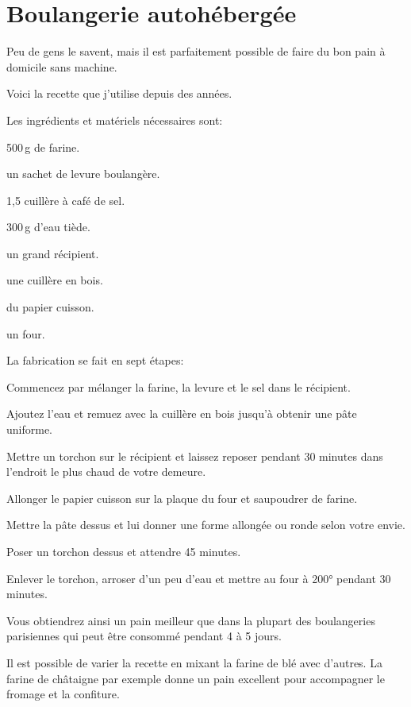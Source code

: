 \section{Boulangerie autohébergée}

Peu de gens le savent, mais il est parfaitement possible de faire du bon pain
à domicile sans machine.

Voici la recette que j'utilise depuis des années.

Les ingrédients et matériels nécessaires sont:

\begin{ingredients}
	\item 500\,g de farine.
	\item un sachet de levure boulangère.
	\item 1,5 cuillère à café de sel.
	\item 300\,g d'eau tiède.
	\item un grand récipient.
	\item une cuillère en bois.
	\item du papier cuisson.
	\item un four.
\end{ingredients}

La fabrication se fait en sept étapes:
\begin{instructions}

	\item Commencez par mélanger la farine, la levure et le sel dans le
	récipient.

	\item Ajoutez l'eau et remuez avec la cuillère en bois jusqu'à obtenir une
	pâte uniforme.

	\item Mettre un torchon sur le récipient et laissez reposer pendant 30
	minutes dans l'endroit le plus chaud de votre demeure.

	\item Allonger le papier cuisson sur la plaque du four et saupoudrer de
	farine.

	\item Mettre la pâte dessus et lui donner une forme allongée ou ronde
	selon votre envie.

	\item Poser un torchon dessus et attendre 45 minutes.

	\item Enlever le torchon, arroser d'un peu d'eau et mettre au four à 200°
	pendant 30 minutes.

\end{instructions}

Vous obtiendrez ainsi un pain meilleur que dans la plupart des boulangeries parisiennes qui peut être consommé pendant 4 à 5 jours.

\begin{remarque}

Il est possible de varier la recette en mixant la farine de blé avec d'autres.
La farine de châtaigne par exemple donne un pain excellent pour accompagner le
fromage et la confiture.

\end{remarque}